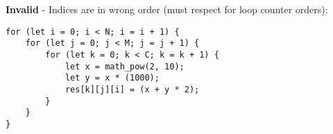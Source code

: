 \textbf{Invalid} - Indices are in wrong order (must respect for loop counter orders):
\begin{verbatim}
for (let i = 0; i < N; i = i + 1) {
    for (let j = 0; j < M; j = j + 1) {
        for (let k = 0; k < C; k = k + 1) {
            let x = math_pow(2, 10);
            let y = x * (1000);
            res[k][j][i] = (x + y * 2);
        }
    }
}
\end{verbatim}

\newpage



\newpage





